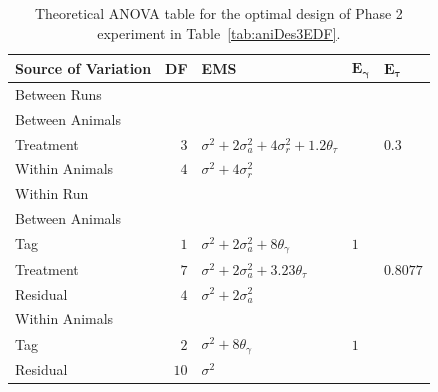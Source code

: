 \begin{table}[!ht]
\centering
 \caption{Theoretical ANOVA table for the optimal design of Phase 2 experiment in Table~\ref{tab:aniDes3EDF}.}
 \begin{tabular}[t]{lrlll} 
 \toprule 
 \multicolumn{1}{l}{\textbf{Source of Variation}} & \multicolumn{1}{l}{\textbf{DF}} & \multicolumn{1}{l}{\textbf{EMS}}& \multicolumn{1}{l}{$\bm{E_{\gamma}}$}&\multicolumn{1}{l}{$\bm{E_{\tau}}$}\\ 
 \midrule 
 Between Runs &  &  & & \\ 
 \quad Between Animals &  &  & & \\ 
 \quad \quad Treatment & $3$ & $\sigma^2+2\sigma_{a}^2+4\sigma_{r}^2+1.2\theta_{\tau}$ & & $0.3$\\ 
 \quad Within Animals & $4$ & $\sigma^2+4\sigma_{r}^2$ & & \\ \hline 
 Within Run &  &  & & \\ 
 \quad Between Animals &  &  & & \\ 
 \quad \quad Tag & $1$ & $\sigma^2+2\sigma_{a}^2+8\theta_{\gamma}$ &$1$ & \\ 
 \quad \quad Treatment & $7$ & $\sigma^2+2\sigma_{a}^2+ 3.23\theta_{\tau}$ & & $0.8077$\\ 
 \quad \quad Residual & $4$ & $\sigma^2+2\sigma_{a}^2$ & & \\ \hline 
 \quad Within Animals &  &  & & \\ 
 \quad \quad Tag & $2$ & $\sigma^2+8\theta_{\gamma}$ &$1$ & \\ 
 \quad \quad Residual & $10$ & $\sigma^2$ & & \\ 
 \bottomrule 
 \end{tabular} 
 \label{tab:ANOVAPhaseCRD31} 


\end{table}
